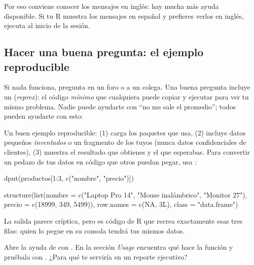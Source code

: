 Por eso conviene conocer los mensajes en inglés: hay mucha más ayuda
disponible. Si tu R muestra los mensajes en español y prefieres verlos en
inglés, ejecuta  al inicio de la
sesión.

\subsection{Hacer una buena pregunta: el ejemplo reproducible}

Si nada funciona, pregunta en un foro o a un colega. Una buena pregunta
incluye un  (\emph{reprex}): el código
\emph{mínimo} que cualquiera puede copiar y ejecutar para ver tu mismo
problema. Nadie puede ayudarte con ``no me sale el promedio''; todos pueden
ayudarte con esto:


Un buen ejemplo reproducible: (1) carga los paquetes que usa, (2) incluye
datos pequeños \emph{inventados} o un fragmento de los tuyos (nunca datos
confidenciales de clientes), (3) muestra el resultado que obtienes y el
que esperabas. Para convertir un pedazo de tus datos en código que otros
puedan pegar, usa :

\begin{rcode}
dput(productos[1:3, c("nombre", "precio")])
\end{rcode}
\begin{rsalida}
structure(list(nombre = c("Laptop Pro 14", "Mouse inalámbrico", 
"Monitor 27"), precio = c(18999, 349, 5499)), row.names = c(NA, 
3L), class = "data.frame")
\end{rsalida}

La salida parece críptica, pero es código de R que recrea exactamente
esas tres filas: quien lo pegue en su consola tendrá tus mismos datos.

\begin{hazlotu}
Abre la ayuda de  con . En la sección
\emph{Usage} encuentra qué hace la función  y pruébala con
. ¿Para qué te serviría en un reporte
ejecutivo?
\end{hazlotu}

